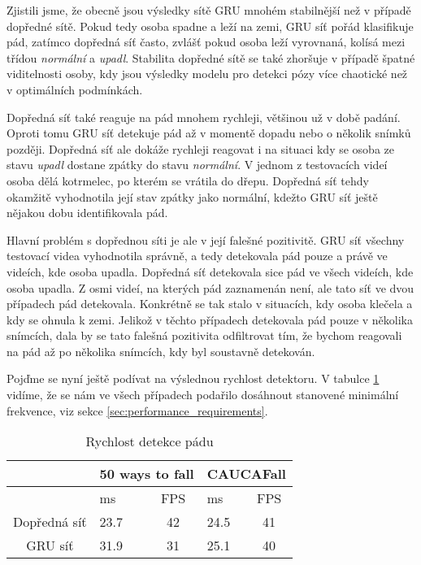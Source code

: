 Zjistili jsme, že obecně jsou výsledky sítě GRU mnohém stabilnější než v
případě dopředné sítě. Pokud tedy osoba spadne a leží na zemi, GRU síť pořád
klasifikuje pád, zatímco dopředná síť často, zvlášť pokud osoba leží vyrovnaná,
kolísá mezi třídou \textit{normální} a \textit{upadl}. Stabilita dopředné sítě
se také zhoršuje v případě špatné viditelnosti osoby, kdy jsou výsledky modelu
pro detekci pózy více chaotické než v optimálních podmínkách.

Dopředná síť také reaguje na pád mnohem rychleji, většinou už v době padání.
Oproti tomu GRU síť detekuje pád až v momentě dopadu nebo o několik snímků
později. Dopředná síť ale dokáže rychleji reagovat i na situaci kdy se osoba ze
stavu \textit{upadl} dostane zpátky do stavu \textit{normální}. V jednom z
testovacích videí osoba dělá kotrmelec, po kterém se vrátila do dřepu. Dopředná
síť tehdy okamžitě vyhodnotila její stav zpátky jako normální, kdežto GRU síť
ještě nějakou dobu identifikovala pád.

Hlavní problém s dopřednou síti je ale v její falešné pozitivitě. GRU síť
všechny testovací videa vyhodnotila správně, a tedy detekovala pád pouze a
právě ve videích, kde osoba upadla. Dopředná síť detekovala sice pád ve všech
videích, kde osoba upadla. Z osmi videí, na kterých pád zaznamenán není, ale
tato síť ve dvou případech pád detekovala. Konkrétně se tak stalo v situacích,
kdy osoba klečela a kdy se ohnula k zemi. Jelikož v těchto případech detekovala
pád pouze v několika snímcích, dala by se tato falešná pozitivita odfiltrovat
tím, že bychom reagovali na pád až po několika snímcích, kdy byl soustavně
detekován.

Pojďme se nyní ještě podívat na výslednou rychlost detektoru. V tabulce
\ref{tab:detectorSpeed} vidíme, že se nám ve všech případech podařilo dosáhnout
stanovené minimální frekvence, viz sekce \ref{sec:performance_requirements}.

\begin{table}[htbp]
    \centering
    \caption{Rychlost detekce pádu}
    \label{tab:detectorSpeed}
    \begin{tabular}{|c|cc|cc|}
        \hline
                     & \multicolumn{2}{l|}{50 ways to fall} & \multicolumn{2}{l|}{CAUCAFall}                                   \\ \hline
                     & \multicolumn{1}{l|}{ms}              & FPS                            & \multicolumn{1}{l|}{ms}   & FPS \\ \hline
        Dopředná síť & \multicolumn{1}{l|}{23.7}            & 42                             & \multicolumn{1}{l|}{24.5} & 41  \\ \hline
        GRU síť      & \multicolumn{1}{l|}{31.9}            & 31                             & \multicolumn{1}{l|}{25.1} & 40  \\ \hline
    \end{tabular}
\end{table}
\endinput

